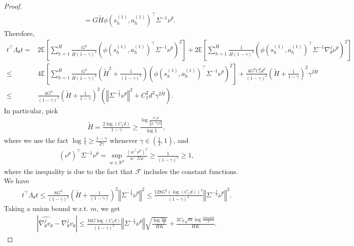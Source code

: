 \documentclass{article}
\numberwithin{equation}{section}
\begin{document}
\begin{proof}
\begin{align*}
&=G\tilde{H}\phi\left(s_h^{(1)},a_h^{(1)}\right)^\top\Sigma^{-1}\nu^\theta.
\end{align*}
Therefore,
\begin{align*}
t^\top \Lambda_\theta t=&2\mathbb{E}\left[\sum_{h=1}^H\frac{G^2}{H(1-\gamma)^4}\left(\phi\left(s_h^{(1)},a_h^{(1)}\right)^\top\Sigma^{-1}\nu^\theta\right)^2\right]+2\mathbb{E}\left[\sum_{h=1}^H\frac{1}{H(1-\gamma)^2}\left(\phi\left(s_h^{(1)},a_h^{(1)}\right)^\top\Sigma^{-1}\nabla_\theta^j\nu^\theta\right)^2\right]\\
\leq&4\mathbb{E}\left[\sum_{h=1}^H\frac{G^2}{H(1-\gamma)^2}\left(\tilde{H}^2+\frac{1}{(1-\gamma)^2}\right)\left(\phi\left(s_h^{(1)},a_h^{(1)}\right)^\top\Sigma^{-1}\nu^\theta\right)^2\right]+\frac{4G^2C_1^2d^2}{(1-\gamma)^2}\left(\tilde{H}+\frac{1}{1-\gamma}\right)^2\gamma^{2\tilde{H}}\\
\leq&\frac{4G^2}{(1-\gamma)^2}\left(\tilde{H}+\frac{1}{1-\gamma}\right)^2\left(\left\Vert\Sigma^{-\frac{1}{2}}\nu^\theta\right\Vert^2 + C_1^2d^2\gamma^{2\tilde{H}}\right).
\end{align*}
In particular, pick 
\begin{align*}
\tilde{H} = \frac{2\log(C_1d)}{1-\gamma}\geq\frac{\log\frac{C_1d}{\left\Vert\Sigma^{-\frac{1}{2}}\nu^\theta\right\Vert}}{\log\frac{1}{\gamma}},
\end{align*}
where we use the fact $\log\frac{1}{\gamma}\geq \frac{1-\gamma}{2\gamma}$ whenever $\gamma\in(\frac{1}{2},1)$, and
\begin{align*}
\left(\nu^\theta\right)^\top\Sigma^{-1}\nu^\theta = \sup_{w\in\mathbb{R}^d}\frac{\left(w^\top \nu^\theta\right)^2}{w^\top\Sigma w} \geq \frac{1}{(1-\gamma)^2} \geq 1,
\end{align*}
where the inequality is due to the fact that $\mathcal{F}$ includes the constant functions. We have
\begin{align*}
t^\top \Lambda_\theta t\leq \frac{8G^2}{(1-\gamma)^2}\left(\tilde{H}+\frac{1}{(1-\gamma)}\right)^2\left\Vert\Sigma^{-\frac{1}{2}}\nu^\theta\right\Vert^2\leq \frac{128G^2\left(\log(C_1d)\right)^2}{(1-\gamma)^4}\left\Vert\Sigma^{-\frac{1}{2}}\nu^\theta\right\Vert^2.
\end{align*}
Taking a union bound w.r.t. $m$, we get
\begin{align*}
\left\vert\widehat{\nabla_\theta^j v_\theta}-\nabla_\theta^j v_\theta\right\vert\leq\frac{16G\log(C_1d)}{(1-\gamma)^2}\left\Vert\Sigma^{-\frac{1}{2}}\nu^\theta\right\Vert\sqrt{\frac{\log\frac{8m}{\delta}}{HK}}+\frac{2C_\theta\sqrt{m}\log\frac{32mdH}{\delta}}{HK}.
\end{align*}
\end{proof}
\end{document}
